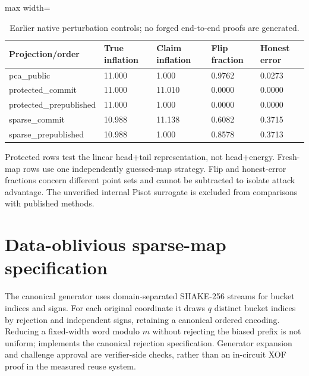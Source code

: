 \documentclass[5p,times,twocolumn]{elsarticle}
\theoremstyle{plain}
\theoremstyle{definition}
\theoremstyle{remark}
\begin{document}
\par\endgroup
\begingroup\color{RevisionGreen}
\begin{table}[!htbp]\color{RevisionGreen}
\caption{Earlier native perturbation controls; no forged end-to-end proofs are generated.}\label{tab:attack-controls}
\centering\scriptsize
\begin{adjustbox}{max width=\textwidth}
\begin{tabular}{@{}lllll@{}}
\toprule
Projection/order & True inflation & Claim inflation & Flip fraction & Honest error \\
\midrule
pca\_public & 11.000 & 1.000 & 0.9762 & 0.0273 \\
protected\_commit & 11.000 & 11.010 & 0.0000 & 0.0000 \\
protected\_prepublished & 11.000 & 1.000 & 0.0000 & 0.0000 \\
sparse\_commit & 10.988 & 11.138 & 0.6082 & 0.3715 \\
sparse\_prepublished & 10.988 & 1.000 & 0.8578 & 0.3713 \\
\bottomrule
\end{tabular}
\end{adjustbox}
\par\smallskip
\begin{minipage}{\textwidth}\scriptsize Protected rows test the linear head+tail representation, not head+energy. Fresh-map rows use one independently guessed-map strategy. Flip and honest-error fractions concern different point sets and cannot be subtracted to isolate attack advantage. The unverified internal Pisot surrogate is excluded from comparisons with published methods.\end{minipage}
\end{table}


\par\endgroup

\FloatBarrier

\section{\textcolor{RevisionRed}{Data-oblivious sparse-map specification}}\label{app:jl}
\begingroup\color{RevisionRed}
The canonical generator uses domain-separated SHAKE-256 streams for bucket indices and signs. For each original coordinate it draws $q$ distinct bucket indices by rejection and independent signs, retaining a canonical ordered encoding. Reducing a fixed-width word modulo $m$ without rejecting the biased prefix is not uniform;  implements the canonical rejection specification. Generator expansion and challenge approval are verifier-side checks, rather than an in-circuit XOF proof in the measured reuse system.
\end{document}
